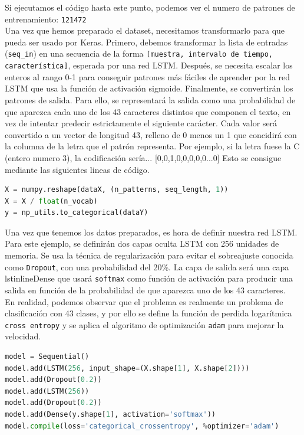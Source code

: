 Si ejecutamos el código hasta este punto, podemos ver el numero de patrones de entrenamiento: \lstinline{121472}\\
Una vez que hemos preparado el dataset, necesitamos transformarlo para que pueda ser usado por Keras. Primero, debemos transformar la lista de entradas (\lstinline{seq_in}) en una secuencia de la forma \lstinline{[muestra, intervalo de tiempo, característica]}, esperada por una red LSTM. Después, se necesita escalar los enteros al rango 0-1 para conseguir patrones más fáciles de aprender por la red LSTM que usa la función de activación sigmoide. Finalmente, se convertirán los patrones de salida. Para ello, se representará la salida como una probabilidad de que aparezca cada uno de los 43 caracteres distintos que componen el texto, en vez de intentar predecir estrictamente el siguiente carácter. Cada valor será convertido a un vector de longitud 43, relleno de 0 menos un 1 que concidirá con la columna de la letra que el patrón representa. Por ejemplo, si la letra fuese la C (entero numero 3), la codificación sería... [0,0,1,0,0,0,0,0...0]
Esto se consigue mediante las siguientes lineas de código.
\begin{lstlisting}[language=Python]
X = numpy.reshape(dataX, (n_patterns, seq_length, 1))
X = X / float(n_vocab)
y = np_utils.to_categorical(dataY)
\end{lstlisting}
Una vez que tenemos los datos preparados, es hora de definir nuestra red LSTM. Para este ejemplo, se definirán dos capas oculta LSTM con 256 unidades de memoria. Se usa la técnica de regularización para evitar el sobreajuste conocida como \lstinline{Dropout}, con una probabilidad del 20\%. La capa de salida será una capa lstinline{Dense} que usará \lstinline{softmax} como función de activación para producir una salida en función de la probabilidad de que aparezca uno de los 43 caracteres.\\
En realidad, podemos observar que el problema es realmente un problema de clasificación con 43 clases, y por ello se define la función de perdida logarítmica \lstinline{cross entropy} y se aplica el algoritmo de optimización \lstinline{adam} para mejorar la velocidad.
\begin{lstlisting}[language=Python]
model = Sequential()
model.add(LSTM(256, input_shape=(X.shape[1], X.shape[2])))
model.add(Dropout(0.2))
model.add(LSTM(256))
model.add(Dropout(0.2))
model.add(Dense(y.shape[1], activation='softmax'))
model.compile(loss='categorical_crossentropy', %optimizer='adam')
\end{lstlisting}
